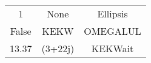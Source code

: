 \documentclass{article}
\begin{document}
\begin{center}
\begin{tabular}{ |c|c|c| } 
\hline
1 & None & Ellipsis \\False & KEKW & OMEGALUL \\13.37 & (3+22j) & KEKWait \\
\hline
\end{tabular}
\end{center}
\end{document}
